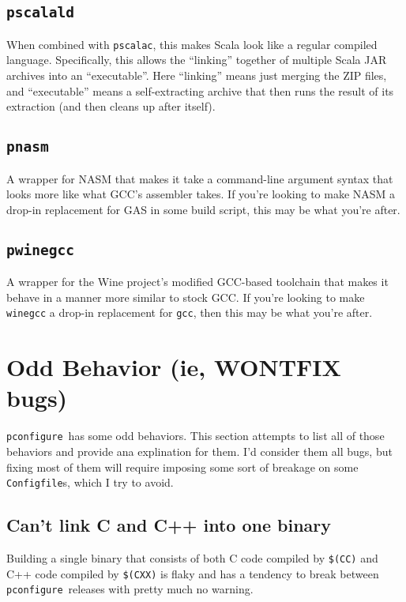 \documentclass{article}
\newcommand{\pconfigure}{\texttt{pconfigure}}
\begin{document}
\subsection{\texttt{pscalald} \label{prog:pscalald}}

When combined with \texttt{pscalac}, this makes Scala look like a
regular compiled language.  Specifically, this allows the ``linking''
together of multiple Scala JAR archives into an ``executable''.  Here
``linking'' means just merging the ZIP files, and ``executable'' means
a self-extracting archive that then runs the result of its extraction
(and then cleans up after itself).

\subsection{\texttt{pnasm} \label{prog:pnasm}}

A wrapper for NASM that makes it take a command-line argument syntax
that looks more like what GCC's assembler takes.  If you're looking to
make NASM a drop-in replacement for GAS in some build script, this may
be what you're after.

\subsection{\texttt{pwinegcc} \label{prog:pwinegcc}}

A wrapper for the Wine project's modified GCC-based toolchain that
makes it behave in a manner more similar to stock GCC.  If you're
looking to make \texttt{winegcc} a drop-in replacement for
\texttt{gcc}, then this may be what you're after.

\section{Odd Behavior (ie, WONTFIX bugs) \label{odd}}

\pconfigure\ has some odd behaviors.  This section attempts to list
all of those behaviors and provide ana explination for them.  I'd
consider them all bugs, but fixing most of them will require imposing
some sort of breakage on some \texttt{Configfile}s, which I try to
avoid.

\subsection{Can't link C and C++ into one binary}

Building a single binary that consists of both C code compiled by
\texttt{\$(CC)} and C++ code compiled by \texttt{\$(CXX)} is flaky and
has a tendency to break between \pconfigure\ releases with pretty much
no warning.
\end{document}
